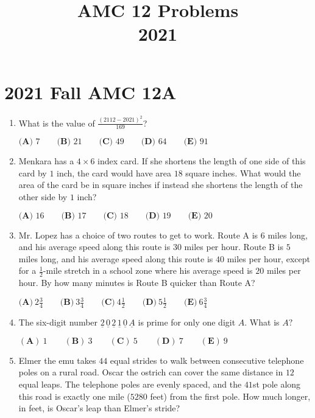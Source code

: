 \documentclass{article}
\title{AMC 12 Problems \\ 2021}
\date{}
\begin{document}
\maketitle\thispagestyle{fancy}\newpage\section*{2021 Fall AMC 12A}
\begin{enumerate}[label=\arabic*., itemsep=0.5em]
\item What is the value of \(\frac{(2112-2021)^2}{169}\)?

\(\textbf{(A) } 7 \qquad\textbf{(B) } 21 \qquad\textbf{(C) } 49 \qquad\textbf{(D) } 64 \qquad\textbf{(E) } 91\)\par \vspace{0.5em}\item Menkara has a \(4 \times 6\) index card. If she shortens the length of one side of this card by \(1\) inch, the card would have area \(18\) square inches. What would the area of the card be in square inches if instead she shortens the length of the other side by \(1\) inch?

\(\textbf{(A) }16\qquad\textbf{(B) }17\qquad\textbf{(C) }18\qquad\textbf{(D) }19\qquad\textbf{(E) }20\)\par \vspace{0.5em}\item Mr. Lopez has a choice of two routes to get to work. Route A is \(6\) miles long, and his average speed along this route is \(30\) miles per hour. Route B is \(5\) miles long, and his average speed along this route is \(40\) miles per hour, except for a \(\frac{1}{2}\)-mile stretch in a school zone where his average speed is \(20\) miles per hour. By how many minutes is Route B quicker than Route A?

\(\textbf{(A)}\ 2 \frac{3}{4}  \qquad\textbf{(B)}\  3 \frac{3}{4} \qquad\textbf{(C)}\  4 \frac{1}{2} \qquad\textbf{(D)}\
 5 \frac{1}{2} \qquad\textbf{(E)}\ 6 \frac{3}{4}\)\par \vspace{0.5em}\item The six-digit number \(\underline{2}\,\underline{0}\,\underline{2}\,\underline{1}\,\underline{0}\,\underline{A}\) is prime for only one digit \(A.\) What is \(A?\)

\((\textbf{A})\: 1\qquad(\textbf{B}) \: 3\qquad(\textbf{C}) \: 5 \qquad(\textbf{D}) \: 7\qquad(\textbf{E}) \: 9\)\par \vspace{0.5em}\item Elmer the emu takes \(44\) equal strides to walk between consecutive telephone poles on a rural road. Oscar the ostrich can cover the same distance in \(12\) equal leaps. The telephone poles are evenly spaced, and the \(41\)st pole along this road is exactly one mile (\(5280\) feet) from the first pole. How much longer, in feet, is Oscar's leap than Elmer's stride?


\end{enumerate}
\end{document}
